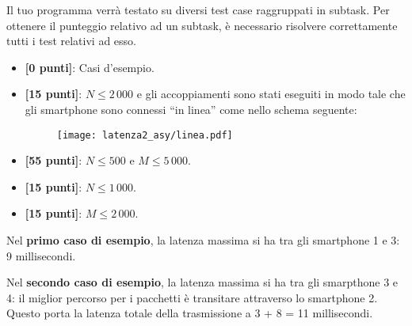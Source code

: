 \Scoring
Il tuo programma verrà testato su diversi test case raggruppati in subtask.
Per ottenere il punteggio relativo ad un subtask, è necessario risolvere
correttamente tutti i test relativi ad esso.
\begin{itemize}[nolistsep,itemsep=2mm]
\item \textbf{ [\phantom{0}0 punti]}: Casi d'esempio.
\item \textbf{ [15 punti]}: $N \le 2\,000$ e gli accoppiamenti sono stati eseguiti in modo tale che gli smartphone sono connessi ``in linea'' come nello schema seguente:
    \begin{figure}[H]
                \centering\texttt{[image: latenza2\_asy/linea.pdf]}
    \end{figure}
\item \textbf{ [55 punti]}: $N \le 500$ e $M \le 5\,000$.
\item \textbf{ [15 punti]}: $N \le 1\,000$.
\item \textbf{ [15 punti]}: $M \le 2\,000$.
\end{itemize}

\Examples
\begin{example}
%
%
\end{example}

\Explanation

Nel \textbf{primo caso di esempio}, la latenza massima si ha tra gli smartphone 1 e 3: 9 millisecondi.

Nel \textbf{secondo caso di esempio}, la latenza massima si ha tra gli smarpthone 3 e 4: il miglior percorso per i pacchetti è transitare attraverso lo smartphone 2. Questo porta la latenza totale della trasmissione a 3 + 8 = 11 millisecondi.
